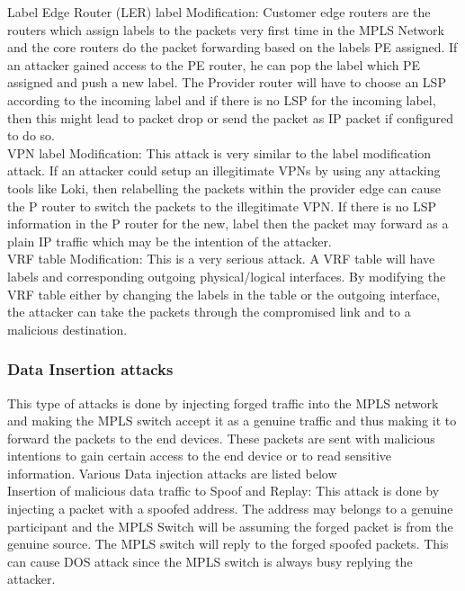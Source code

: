     Label Edge Router (LER) label Modification:  Customer edge routers are the routers which assign labels to the packets very first time in the MPLS Network and the core routers do the packet forwarding based on the labels PE assigned. If an attacker gained access to the PE router, he can pop the label which PE assigned and push a new label. The Provider router will have to choose an LSP according to the incoming label and if there is no LSP for the incoming label, then this might lead to packet drop or send the packet as IP packet if configured to do so.\\

    VPN label Modification: This attack is very similar to the label modification attack. If an attacker could setup an illegitimate VPNs by using any attacking tools like Loki, then relabelling the packets within the provider edge can cause the P router to switch the packets to the illegitimate VPN. If there is no LSP information in the P router for the new, label then the packet may forward as a plain IP traffic which may be the intention of the attacker. \\
    
    VRF table Modification: This is a very serious attack. A VRF table will have labels and corresponding outgoing physical/logical interfaces. By modifying the VRF table either by changing the labels in the table or the outgoing interface, the attacker can take the packets through the compromised link and to a malicious destination.\\
    
    \subsubsection{Data Insertion attacks}
      

This type of attacks is done by injecting forged traffic into the MPLS network and making the MPLS switch accept it as a genuine traffic and thus making it to forward the packets to the end devices. These packets are sent with malicious intentions to gain certain access to the end device or to read sensitive information. Various Data injection attacks are listed below\\

    Insertion of malicious data traffic to Spoof and Replay: This attack is done by injecting a packet with a spoofed address. The address may belongs to a genuine participant and the MPLS Switch will be assuming the forged packet is from the genuine source. The MPLS switch will reply to the forged spoofed packets. This can cause DOS attack since the MPLS switch is always busy replying the attacker.\\

